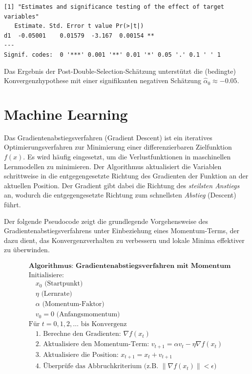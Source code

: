 \documentclass[
  a4paper,
  DIV=11,
  oneside]{scrreprt}
\begin{document}
\begin{verbatim}
[1] "Estimates and significance testing of the effect of target variables"
   Estimate. Std. Error t value Pr(>|t|)   
d1  -0.05001    0.01579  -3.167  0.00154 **
---
Signif. codes:  0 '***' 0.001 '**' 0.01 '*' 0.05 '.' 0.1 ' ' 1
\end{verbatim}

Das Ergebnis der Post-Double-Selection-Schätzung unterstützt die
(bedingte) Konvergenzhypothese mit einer signifikanten negativen
Schätzung \(\widehat{\alpha}_0\approx-0.05\).


\chapter{Machine Learning}\label{machine-learning}

Das Gradientenabstiegsverfahren (Gradient Descent) ist ein iteratives
Optimierungsverfahren zur Minimierung einer differenzierbaren
Zielfunktion \(f(x)\). Es wird häufig eingesetzt, um die
Verlustfunktionen in maschinellen Lernmodellen zu minimieren. Der
Algorithmus aktualisiert die Variablen schrittweise in die
entgegengesetzte Richtung des Gradienten der Funktion an der aktuellen
Position. Der Gradient gibt dabei die Richtung des \emph{steilsten
Anstiegs} an, wodurch die entgegengesetzte Richtung zum schnellsten
\emph{Abstieg} (Descent) führt.

Der folgende Pseudocode zeigt die grundlegende Vorgehensweise des
Gradientenabstiegsverfahrens unter Einbeziehung eines Momentum-Terms,
der dazu dient, das Konvergenzverhalten zu verbessern und lokale Minima
effektiver zu überwinden.

\begin{align}
& \textbf{Algorithmus: Gradientenabstiegsverfahren mit Momentum} \\
& \text{Initialisiere: }\\ 
& \quad x_0 \text{ (Startpunkt) }\\
& \quad \eta \text{ (Lernrate) }\\
& \quad \alpha \text{ (Momentum-Faktor) }\\ 
& \quad v_0 = 0 \text{ (Anfangsmomentum) } \\[1em]
& \text{Für } t = 0, 1, 2, \dots \text{ bis Konvergenz} \\
& \quad \text{1. Berechne den Gradienten: } \nabla f(x_t) \\
& \quad \text{2. Aktualisiere den Momentum-Term: } v_{t+1} = \alpha v_t - \eta \nabla f(x_t) \\
& \quad \text{3. Aktualisiere die Position: } x_{t+1} = x_t + v_{t+1} \\
& \quad \text{4. Überprüfe das Abbruchkriterium (z.B. } \| \nabla f(x_t) \| < \epsilon\text{)} \\
\end{align}
\end{document}
